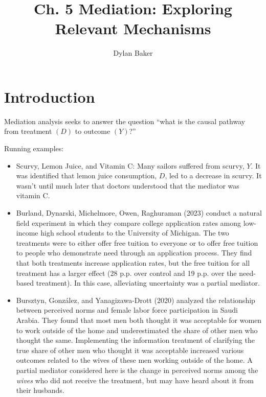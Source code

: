 \documentclass[10pt]{article}
\title{Ch. 5 Mediation: Exploring Relevant Mechanisms}
\author{Dylan Baker}
\begin{document}
\maketitle

\section{Introduction}

Mediation analysis 
seeks to answer the question 
``what is the causal pathway from treatment $(D)$ to outcome $(Y)$?''

Running examples:

\begin{itemize}
    \item Scurvy, Lemon Juice, and Vitamin C: 
        Many sailors suffered from scurvy, $Y$. It was identified 
        that lemon juice consumption, $D$, led to a 
        decrease in scurvy. It wasn't until much later that 
        doctors understood that the mediator was vitamin C.
    \item Burland, Dynarski, Michelmore, Owen, Raghuraman (2023)
        conduct a natural field experiment in which they compare 
        college application rates among low-income 
        high school students to the University of Michigan. 
        The two treatments were to either offer free tuition to 
        everyone or to offer free tuition to people who demonstrate 
        need through an application process. They find that both 
        treatments increase application rates, but the
        free tuition for all treatment has a larger effect (28 p.p. over control 
        and 19 p.p. over the need-based treatment). In this case,
        alleviating uncertainty was a partial mediator.
    \item Bursztyn, González, and Yanagizawa-Drott (2020) 
        analyzed the relationship between perceived norms 
        and female labor force participation in Saudi Arabia. 
        They found that most men both thought it was 
        acceptable for women to work outside of the home 
        and underestimated the share of other men who thought the same.
        Implementing the information treatment of clarifying the 
        true share of other men who thought it was acceptable
        increased various outcomes related to the wives of 
        these men working outside of the home. A partial mediator 
        considered here is the change in perceived norms among 
        the \emph{wives} who did not receive the treatment, but 
        may have heard about it from their husbands.
\end{itemize}
\end{document}
